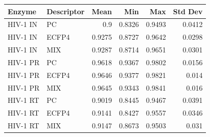 \begin{tabular}{llrrrr}
\toprule
Enzyme & Descriptor & Mean & Min & Max & Std Dev \\
\midrule
HIV-1 IN & PC & 0.9 & 0.8326 & 0.9493 & 0.0412 \\
HIV-1 IN & ECFP4 & 0.9275 & 0.8727 & 0.9642 & 0.0298 \\
HIV-1 IN & MIX & 0.9287 & 0.8714 & 0.9651 & 0.0301 \\
HIV-1 PR & PC & 0.9618 & 0.9367 & 0.9802 & 0.0156 \\
HIV-1 PR & ECFP4 & 0.9646 & 0.9377 & 0.9821 & 0.014 \\
HIV-1 PR & MIX & 0.9645 & 0.9343 & 0.9841 & 0.016 \\
HIV-1 RT & PC & 0.9019 & 0.8445 & 0.9467 & 0.0391 \\
HIV-1 RT & ECFP4 & 0.9141 & 0.8427 & 0.9557 & 0.0346 \\
HIV-1 RT & MIX & 0.9147 & 0.8673 & 0.9503 & 0.031 \\
\bottomrule
\end{tabular}
